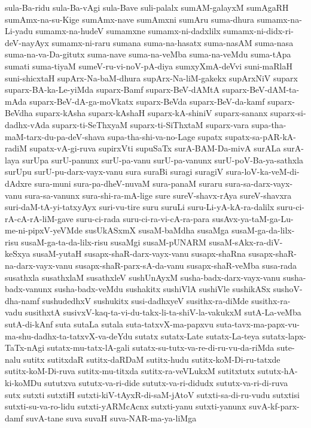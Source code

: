 {sula-Ba-ridu
sula-Ba-vAgi
sula-Bave
suli-palalx
sumAM-galayxM
sumAgaRH
sumAmx-na-su-Kige
sumAmx-nave
sumAmxni
sumAru
suma-dhura
sumamx-na-Li-yadu
sumamx-na-hudeV
sumamxne
sumamx-ni-dadxlilx
sumamx-ni-didx-ri-deV-nayAyx
sumamx-ni-raru
sumana
suma-na-hasatx
suma-nasAM
suma-nasa
suma-na-va-Da-gitutx
suma-nave
suma-na-veMba
suma-na-veMdu
suma-tApa
sumati
suma-tiyaM
sumeV-ru-vi-noV-pA-diya
sumxyXmA-deVvi
suni-maRlaH
suni-shicxtaH
supArx-Na-baM-dhura
supArx-Na-liM-gakekx
supArxNiV
suparx
suparx-BA-ka-Le-yiMda
suparx-Bamf
suparx-BeV-dAMtA
suparx-BeV-dAM-ta-mAda
suparx-BeV-dA-ga-moVkatx
suparx-BeVda
suparx-BeV-da-kamf
suparx-BeVdha
suparx-kAsha
suparx-kAshaH
suparx-kA-shiniV
suparx-sananx
suparx-si-dadhx-vAda
suparx-ti-SeThxyaM
suparx-ti-SiThxtaM
suparx-vara
supa-tha-maM-tarx-du-pa-deV-shava
supa-tha-shi-va-no-Lage
supatx
supatx-sa-pAR-kA-radiM
supatx-vA-gi-ruva
supirxVti
supuSaTx
surA-BAM-Da-mivA
surALa
surA-laya
surUpa
surU-panunx
surU-pa-vanu
surU-pa-vanunx
surU-poV-Ba-ya-sathxla
surUpu
surU-pu-darx-vayx-vanu
sura
suraBi
suragi
suragiV
sura-loV-ka-veM-di-dAdxre
sura-muni
sura-pa-dheV-nuvaM
sura-panaM
suraru
sura-sa-darx-vayx-vanu
sura-sa-vanunx
sura-shi-ra-mA-lige
sure
sureV-shavx-rAya
sureV-shavxra
suri-daM-tA-yi-tatxyAyx
suri-vu-tire
suru
suruLi
suru-Li-yA-kA-ra-dalilx
suru-ci-rA-cA-rA-liM-gave
suru-ci-rada
suru-ci-ra-vi-cA-ra-para
susAvx-ya-taM-ga-Lu-me-ni-pipxV-yeVMde
susUkASxmX
susaM-baMdha
susaMga
susaM-ga-da-lilx-risu
susaM-ga-ta-da-lilx-risu
susaMgi
susaM-pUNARM
susaM-sAkx-ra-diV-keSxya
susaM-yutaH
susapx-shaR-darx-vayx-vanu
susapx-shaRna
susapx-shaR-na-darx-vayx-vanu
susapx-shaR-parx-sA-da-vanu
susapx-shaR-veMba
susa-rada
susathxla
susathxlaM
susathxleV
sushUnAyxM
susha-badx-darx-vayx-vanu
susha-badx-vanunx
susha-badx-veMdu
sushakitx
sushiVlA
sushiVle
sushikASx
sushoV-dha-namf
sushudedhxV
sushukitx
susi-dadhxyeV
susithx-ra-diMde
susithx-ra-vadu
susithxtA
susivxV-kaq-ta-vi-du-takx-li-ta-shiV-la-vakukxM
sutA-La-veMba
sutA-di-kAnf
suta
sutaLa
sutala
suta-tatxvX-ma-papxvu
suta-tavx-ma-papx-vu-ma-shu-dadhx-ta-tatxvX-va-deYdu
sutatx
sutatx-Late
sutatx-La-teya
sutatx-lapx-TaTx-nAgi
sutatx-mu-tatx-lA-gali
sutatx-su-tutx-va-re-di-ru-vu-da-riMda
sute-nalu
sutitx
sutitxdaR
sutitx-daRDaM
sutitx-hudu
sutitx-koM-Di-ru-tatxde
sutitx-koM-Di-ruva
sutitx-mu-titxda
sutitx-ra-veVLukxM
sutitxtutx
sututx-hA-ki-koMDu
sututxva
sututx-va-ri-dide
sututx-va-ri-didudx
sututx-va-ri-di-ruva
sutx
sutxti
sutxtiH
sutxti-kiV-tAyxR-di-saM-jAtoV
sutxti-sa-di-ru-vudu
sutxtisi
sutxti-su-va-ro-lidu
sutxti-yARMcAcnx
sutxti-yanu
sutxti-yanunx
suvA-kf-parx-damf
suvA-tane
suva
suvaH
suva-NAR-ma-ya-liMga
}
